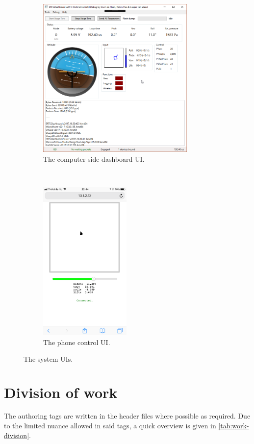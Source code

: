 \documentclass[final]{article}
\begin{document}
\begin{figure}[H]
    \begin{subfigure}[b]{0.6\textwidth}
    \centering
        \includegraphics[height=8cm]{resources/dashboard-gui.png}
        \caption{The computer side dashboard UI.}
        \label{fig:pc-dashboard-gui}
    \end{subfigure}
    ~
    \begin{subfigure}[b]{0.4\textwidth}
    \centering
        \includegraphics[height=8cm]{resources/phone-gui.PNG}
        \caption{The phone control UI.}
        \label{fig:phone-control-gui}
    \end{subfigure}
    \caption{The system UIs.}
    \label{fig:system-guis}
\end{figure}

\section{Division of work}
The authoring tags are written in the header files where possible as required.
Due to the limited nuance allowed in said tags, a quick overview is given in \cref{tab:work-division}.
\end{document}
